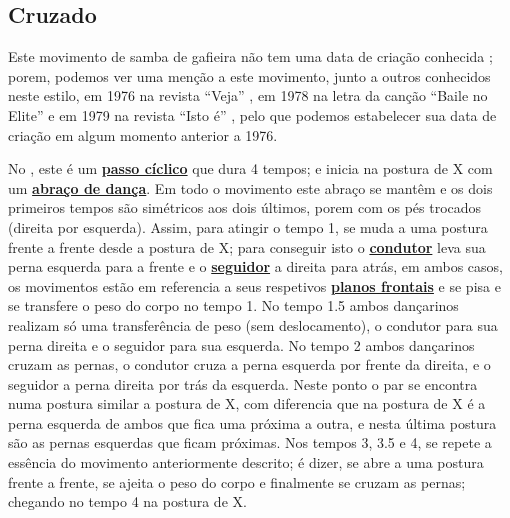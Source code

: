\subsection{Cruzado}
Este movimento de samba de gafieira não tem uma data de criação conhecida \cite[pp. 143]{perna2002samba};
porem, podemos ver uma menção a este movimento, junto a outros conhecidos neste estilo,
em 1976 na revista ``Veja'' \cite[pp. 158]{1976veja},
em 1978 na letra da canção ``Baile no Elite'' \cite{BaileNoElite}  e 
em 1979 na revista ``Isto é'' \cite[pp. 89]{revista1979isto},
pelo que podemos estabelecer sua data de criação em algum momento anterior a 1976.

No \AnoLivro, este é um \hyperref[def:PassoCiclico]{\textbf{passo cíclico}} que dura 4 tempos;
e inicia na postura de X com um \hyperref[def:abracodedanca]{\textbf{abraço de dança}}.
Em todo o movimento este abraço se mantêm e os dois primeiros tempos 
são simétricos aos dois últimos, porem com os pés trocados (direita por esquerda). 
Assim, para atingir o tempo 1, se muda a uma postura frente a frente desde a postura de X;
para conseguir isto o \hyperref[def:Condutor]{\textbf{condutor}} 
leva sua perna esquerda para a frente e o \hyperref[def:Seguidor]{\textbf{seguidor}}  a direita para atrás,
em ambos casos, os movimentos estão em referencia a seus 
respetivos \hyperref[def:PlanoFrontal]{\textbf{planos frontais}} e 
se pisa e se transfere o peso do corpo no tempo 1.
No tempo 1.5 ambos dançarinos realizam só uma transferência de peso (sem deslocamento),
o condutor para sua perna direita e o seguidor para sua esquerda.
No tempo 2 ambos dançarinos cruzam as pernas, 
o condutor cruza a perna esquerda por frente da direita, e o seguidor a perna direita por trás da esquerda.
Neste ponto o par se encontra numa postura similar a postura de X, 
com diferencia que na postura de X é a perna esquerda de ambos que fica uma próxima a outra,
e nesta última postura são as pernas esquerdas que ficam próximas.
Nos tempos 3, 3.5 e 4, se repete a essência do movimento anteriormente descrito;
é dizer, se abre a uma postura frente a frente, se ajeita o peso do corpo e finalmente se cruzam as pernas;
chegando no tempo 4 na postura de X.



